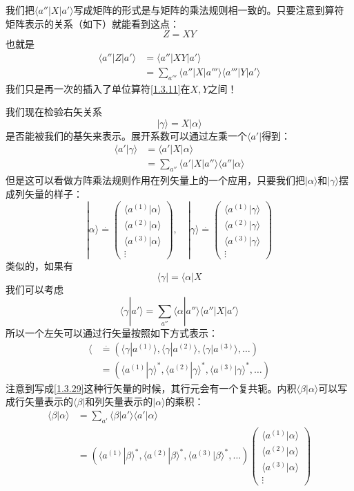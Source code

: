 \documentclass[UTF8,twoside]{ctexart}
\def\be{\begin{equation}}
\def\ee{\end{equation}}
\begin{document}
我们把$\langle a''|X|a'\rangle$写成矩阵的形式是与矩阵的乘法规则相一致的。只要注意到算符矩阵表示的关系（如下）就能看到这点：
\be
Z = XY
\ee
也就是
\be\begin{split}
\langle a''|Z|a'\rangle &= \langle a''|XY|a'\rangle\\
&=\sum_{a'''}\langle a''|X|a'''\rangle\langle a'''|Y|a'\rangle
\end{split}\ee
我们只是再一次的插入了单位算符\eqref{1.3.11}在$X, Y$之间！

我们现在检验右矢关系
\be
|\gamma\rangle = X|\alpha\rangle
\ee
是否能被我们的基矢来表示。展开系数可以通过左乘一个$\langle a'|$得到：
\be\begin{split}
\langle a'|\gamma\rangle &= \langle a'|X|\alpha\rangle\\
&=\sum_{a''} \langle a'|X|a''\rangle\langle a''|\alpha\rangle
\end{split}\ee
但是这可以看做方阵乘法规则作用在列矢量上的一个应用，只要我们把$|\alpha\rangle$和$|\gamma\rangle$摆成列矢量的样子：
\be
|\alpha\rangle \overset{\cdot}{=} \left(\begin{matrix}
\langle a^{(1)}|\alpha\rangle\\
\langle a^{(2)}|\alpha\rangle\\
\langle a^{(3)}|\alpha\rangle\\
\vdots
\end{matrix}\right),\quad |\gamma\rangle \overset{\cdot}{=}\left(\begin{matrix}
\langle a^{(1)}|\gamma\rangle\\
\langle a^{(2)}|\gamma\rangle\\
\langle a^{(3)}|\gamma\rangle\\
\vdots
\end{matrix}\right)
\ee
类似的，如果有
\be
\langle\gamma| = \langle\alpha|X
\ee
我们可以考虑
\be
\langle \gamma|a'\rangle = \sum_{a''}\langle \alpha|a''\rangle\langle a''|X|a'\rangle
\ee
所以一个左矢可以通过行矢量按照如下方式表示：
\be\label{1.3.29}\begin{split}
\langle &\overset{\cdot}{=} (\langle\gamma|a^{(1)}\rangle,\langle\gamma|a^{(2)}\rangle,\langle\gamma|a^{(3)}\rangle,\ldots)\\
&=(\langle a^{(1)}|\gamma\rangle^*,\langle a^{(2)}|\gamma\rangle^*,\langle a^{(3)}|\gamma\rangle^*,\ldots)
\end{split}\ee
注意到写成\eqref{1.3.29}这种行矢量的时候，其行元会有一个复共轭。内积$\langle\beta|\alpha\rangle$可以写成行矢量表示的$\langle\beta|$和列矢量表示的$|\alpha\rangle$的乘积：
\be\begin{split}
\langle\beta|\alpha\rangle &= \sum_{a'}\langle\beta|a'\rangle\langle a'|\alpha\rangle\\
&=(\langle a^{(1)}|\beta\rangle^*,\langle a^{(2)}|\beta\rangle^*,\langle a^{(3)}|\beta\rangle^*,\ldots) \left(\begin{matrix}
\langle a^{(1)}|\alpha\rangle\\
\langle a^{(2)}|\alpha\rangle\\
\langle a^{(3)}|\alpha\rangle\\
\vdots
\end{matrix}\right)
\end{split}\ee
\end{document}
